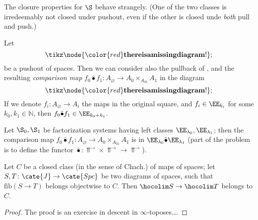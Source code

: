 \documentclass[10pt,a4paper]{amsart}
\begin{document}
\begin{remark}
The closure properties for $\S$ behave strangely. (One of the two classes is irredeemably not closed under pushout, even if the other is closed unde \emph{both} pull and push.)
\end{remark}
\begin{theorem}
Let
\[
\tikz \node {\color{red} \bf there is a missing diagram!};
\]
be a pushout of spaces. Then we can consider also the pullback of $ $, and the resulting \emph{comparison map} $f_0\hat{\bullet} f_1 \colon A_\varnothing \to A_0 \times_{A_{01}} A_1$ in the diagram
\[
\tikz \node {\color{red} \bf there is a missing diagram!};
%
\]
If we denote $f_i \colon A_\varnothing \to A_i$ the maps in the original square, and $f_i\in \EE_{k_i}$ for some $k_0, k_1\in\mathbb{N}$, then $f_0\hat{\bullet} f_1\in \EE_{k_0 + k_1}$.
\end{theorem}
Let $\S_0, \S_1$ be factorization systems having left classes $\EE_{\lambda_0}, \EE_{\lambda_1}$; then the comparison map $f_0\hat{\bullet} f_1 \colon A_\varnothing \to A_0 \times_{A_{01}} A_1$ is in $\EE_{\lambda_0}\hat\bullet \EE_{\lambda_1}$ (part of the problem is to define the functor $\hat\bullet \colon \Top^\to \times \Top^\to \to \Top^\to$).
\begin{lemma}
Let $C$ be a closed class (in the sense of Chach.) of maps of spaces; let $S,T \colon \cate{J} \to \cate{Spc}$ be two diagrams of spaces, such that $\text{fib}(S\to T)$ belongs objectwise to $C$. Then $\hocolim S \to \hocolim T$ belongs to $C$.
\end{lemma}
\begin{proof}
The proof is an exercise in descent in $\infty$-toposes.\dots
\end{proof}

\hrulefill
{}

\end{document}
